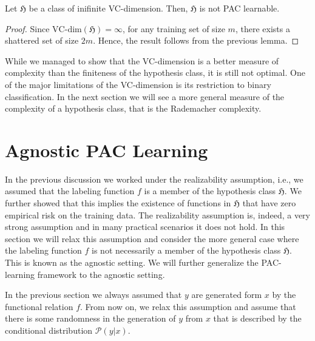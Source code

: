 	\begin{coro}
	Let $\mathfrak{H}$ be a class of inifinite VC-dimension. Then,
	$\mathfrak{H}$ is not PAC learnable.
	\end{coro}
\begin{proof}
	Since $\text{VC-dim}(\mathfrak{H})=\infty$, for any training set of size
	$m$, there exists a shattered set of size $2m$. Hence, the result follows
	from the previous lemma.
\end{proof}
While we managed to show that the VC-dimension is a better measure of complexity
than the finiteness of the hypothesis class, it is still not optimal. One of the
major limitations of the VC-dimension is its restriction to binary
classification. In the next section we will see a more general measure of the
complexity of a hypothesis class, that is the Rademacher complexity.
\section{Agnostic PAC Learning}
In the previous discussion we worked under the realizability assumption, i.e., we assumed that the labeling function $f$ is a member
of the hypothesis class $\mathfrak{H}$. We further showed that this implies the
existence of functions in $\mathfrak{H}$ that have zero empirical risk on the
training data. The realizability assumption is, indeed, a very strong
assumption and in many practical scenarios it does not hold. In this section we
will relax this assumption and consider the more general case where the labeling
function $f$ is not necessarily a member of the hypothesis class $\mathfrak{H}$.
This is known as the agnostic setting. We will further generalize the
PAC-learning framework to the agnostic setting.

In the previous section we always assumed that $y$ are generated form $x$ by the
functional relation $f$. From now on, we relax this assumption and assume that
there is some randomness in the generation of $y$ from $x$ that is described by
the conditional distribution $\mathcal{P}(y|x)$. 

